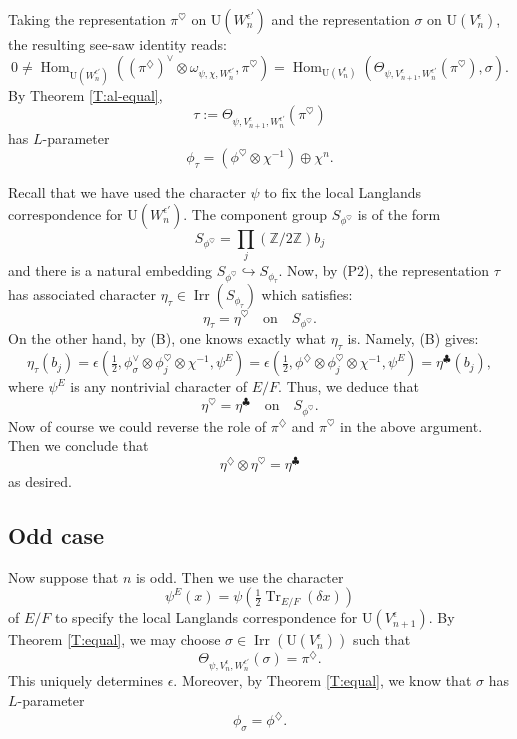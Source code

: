 \documentclass[11pt]{amsart}
\numberwithin{equation}{section}
\theoremstyle{plain}
\theoremstyle{definition}
\theoremstyle{remark}
\def\Hom{\operatorname{Hom}}
\def\Irr{\operatorname{Irr}}
\def\Tr{\operatorname{Tr}}
\def\U{\mathrm{U}}
\def\ZZ{\mathbb{Z}}
\begin{document}
Taking the representation $\pi^{\heartsuit}$ on $\U(W_n^{\epsilon'})$ and the representation $\sigma$ on $\U(V_n^{\epsilon})$, the resulting see-saw identity reads:
\[  
 0 \ne \Hom_{\U(W_n^{\epsilon'})}( (\pi^{\diamondsuit})^{\vee} \otimes \omega_{\psi, \chi, W_n^{\epsilon'}}, \pi^{\heartsuit}) 
   = \Hom_{\U(V_n^{\epsilon})}( \Theta_{\psi, V_{n+1}^{\epsilon}, W_n^{\epsilon'}}(\pi^{\heartsuit}),  \sigma). \]
By Theorem \ref{T:al-equal}, 
\[ \tau := \Theta_{\psi, V_{n+1}^{\epsilon}, W_n^{\epsilon'}}(\pi^{\heartsuit}) \]
has $L$-parameter
\[  \phi_{\tau} =  (\phi^{\heartsuit} \otimes \chi^{-1}) \oplus \chi^n. \]

Recall that we have used the character $\psi$ to fix the local Langlands correspondence for $\U(W_n^{\epsilon'})$.
The component group $S_{\phi^{\heartsuit}}$ is of the form 
\[  S_{\phi^{\heartsuit}} = \prod_j  (\ZZ / 2\ZZ) b_j \]
and there is a natural embedding $S_{\phi^{\heartsuit}} \hookrightarrow S_{\phi_\tau}$.
Now, by (P2), the representation $\tau$ has associated character $\eta_{\tau} \in \Irr(S_{\phi_{\tau}})$ which satisfies:
\[  \eta_{\tau}   = \eta^{\heartsuit} \quad \text{on} \quad S_{\phi^{\heartsuit}}. \]
On the other hand, by (B), one knows exactly what $\eta_{\tau}$ is. Namely, (B) gives: 
\[  \eta_{\tau}(b_j)  = \epsilon(\tfrac{1}{2}, \phi_{\sigma}^{\vee} \otimes \phi_j^{\heartsuit} \otimes \chi^{-1}, \psi^E) = 
\epsilon(\tfrac{1}{2}, \phi^{\diamondsuit} \otimes \phi_j^{\heartsuit} \otimes \chi^{-1}, \psi^E) = \eta^{\clubsuit}(b_j), \]
where $\psi^E$ is any nontrivial character of $E/F$. Thus, we deduce that
\[  \eta^{\heartsuit}   =   \eta^{\clubsuit} \quad \text{on} \quad S_{\phi^{\heartsuit}}. \]
Now of course we could reverse the role of $\pi^{\diamondsuit}$ and $\pi^{\heartsuit}$ in the above argument. Then we conclude that
\[  \eta^{\diamondsuit} \otimes \eta^{\heartsuit}  =  \eta^{\clubsuit} \]
as desired.

\subsection{Odd case}

Now suppose that $n$ is odd. Then we use the character  
\[  \psi^E(x) = \psi(\tfrac{1}{2} \Tr_{E/F}(\delta x)) \]
of $E/F$ to specify the local Langlands correspondence for $\U(V_{n+1}^{\epsilon})$.
By Theorem \ref{T:equal}, we may choose $\sigma \in \Irr(\U(V_n^{\epsilon}))$ such that 
\[  \Theta_{\psi, V_n^{\epsilon},  W_n^{\epsilon'}}(\sigma)  =  \pi^{\diamondsuit}. \] 
This uniquely determines $\epsilon$. Moreover, by Theorem \ref{T:equal}, we know that $\sigma$ has $L$-parameter
\[  \phi_{\sigma} =  \phi^{\diamondsuit}. \]
\end{document}
